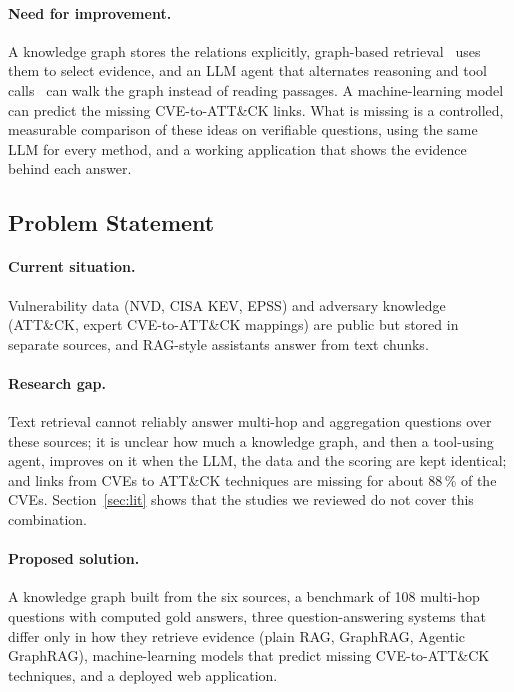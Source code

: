 \documentclass[12pt, a4paper]{article}
\newcommand{\ATTCK}{ATT\&CK}
\begin{document}
\paragraph{Need for improvement.} A knowledge graph stores the relations explicitly, graph-based retrieval~\cite{edge2024,peng2024} uses them to select evidence, and an LLM agent that alternates reasoning and tool calls~\cite{yao2023} can walk the graph instead of reading passages. A machine-learning model can predict the missing CVE-to-\ATTCK{} links. What is missing is a controlled, measurable comparison of these ideas on verifiable questions, using the same LLM for every method, and a working application that shows the evidence behind each answer.


\subsection{Problem Statement}
\paragraph{Current situation.} Vulnerability data (NVD, CISA KEV, EPSS) and adversary knowledge (\ATTCK{}, expert CVE-to-\ATTCK{} mappings) are public but stored in separate sources, and RAG-style assistants answer from text chunks.
\paragraph{Research gap.} Text retrieval cannot reliably answer multi-hop and aggregation questions over these sources; it is unclear how much a knowledge graph, and then a tool-using agent, improves on it when the LLM, the data and the scoring are kept identical; and links from CVEs to \ATTCK{} techniques are missing for about 88\,\% of the CVEs. Section~\ref{sec:lit} shows that the studies we reviewed do not cover this combination.
\paragraph{Proposed solution.} A knowledge graph built from the six sources, a benchmark of 108 multi-hop questions with computed gold answers, three question-answering systems that differ only in how they retrieve evidence (plain RAG, GraphRAG, Agentic GraphRAG), machine-learning models that predict missing CVE-to-\ATTCK{} techniques, and a deployed web application.
\end{document}
